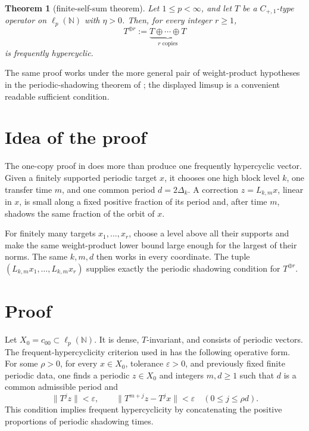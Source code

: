 \documentclass[11pt]{article}
\newtheorem{theorem}{Theorem}
\newcommand{\N}{\mathbb N}
\begin{document}
\begin{theorem}[finite-self-sum theorem]\label{thm:main}
Let \(1\le p<\infty\), and let \(T\) be a \(C_{+,1}\)-type operator on
\(\ell_p(\N)\) with \(\eta>0\).  Then, for every integer \(r\ge1\),
\[
 T^{\oplus r}:=\underbrace{T\oplus\cdots\oplus T}_{r\text{ copies}}
\]
is frequently hypercyclic.
\end{theorem}

The same proof works under the more general pair of weight-product hypotheses
in the periodic-shadowing theorem of \cite{gmm}; the displayed limsup is a
convenient readable sufficient condition.

\section*{Idea of the proof}
The one-copy proof in \cite[Thms.~5.31 and 6.9]{gmm} does more than produce one frequently
hypercyclic vector.  Given a finitely supported periodic target \(x\), it
chooses one high block level \(k\), one transfer time \(m\), and one common
period \(d=2\Delta_k\).  A correction \(z=L_{k,m}x\), linear in \(x\), is
small along a fixed positive fraction of its period and, after time \(m\),
shadows the same fraction of the orbit of \(x\).

For finitely many targets \(x_1,\ldots,x_r\), choose a level above all their
supports and make the same weight-product lower bound large enough for the
largest of their norms.  The same \(k,m,d\) then works in every coordinate.
The tuple \((L_{k,m}x_1,\ldots,L_{k,m}x_r)\) supplies exactly the periodic
shadowing condition for \(T^{\oplus r}\).

\section*{Proof}
Let \(X_0=c_{00}\subset\ell_p(\N)\).  It is dense, \(T\)-invariant, and
consists of periodic vectors.  The frequent-hypercyclicity criterion used in
\cite{gmm} has the following operative form.  For some \(\rho>0\), for every
\(x\in X_0\), tolerance \(\varepsilon>0\), and previously fixed finite
periodic data, one finds a periodic \(z\in X_0\) and integers \(m,d\ge1\)
such that \(d\) is a common admissible period and
\begin{equation}\label{eq:shadow}
 \|T^jz\|<\varepsilon,
 \qquad
 \|T^{m+j}z-T^jx\|<\varepsilon
 \quad(0\le j\le \rho d).
\end{equation}
This condition implies frequent hypercyclicity by concatenating the positive
proportions of periodic shadowing times.
\end{document}
